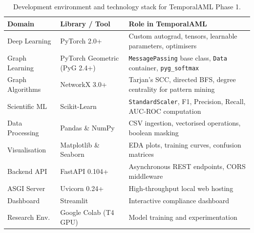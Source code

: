 \begin{table}[!htbp]
\centering
\small
\setlength{\tabcolsep}{4pt}
\renewcommand{\arraystretch}{0.94}
\caption[Technology Stack]{Development environment and technology stack for TemporalAML Phase 1.}
\label{tab:tech_stack}
\begin{tabularx}{\textwidth}{>{\hsize=0.72\hsize\raggedright\arraybackslash}X >{\hsize=0.88\hsize\raggedright\arraybackslash}X >{\hsize=1.40\hsize\raggedright\arraybackslash}X}
\toprule
\textbf{Domain} & \textbf{Library / Tool} & \textbf{Role in TemporalAML} \\
\midrule
Deep Learning & PyTorch 2.0+ & Custom autograd, tensors, learnable parameters, optimisers \\
Graph Learning & PyTorch Geometric (PyG 2.4+) & \texttt{MessagePassing} base class, \texttt{Data} container, \texttt{pyg\_softmax} \\
Graph Algorithms & NetworkX 3.0+ & Tarjan's SCC, directed BFS, degree centrality for pattern mining \\
Scientific ML & Scikit-Learn & \texttt{StandardScaler}, F1, Precision, Recall, AUC-ROC computation \\
Data Processing & Pandas \& NumPy & CSV ingestion, vectorised operations, boolean masking \\
Visualisation & Matplotlib \& Seaborn & EDA plots, training curves, confusion matrices \\
Backend API & FastAPI 0.104+ & Asynchronous REST endpoints, CORS middleware \\
ASGI Server & Uvicorn 0.24+ & High-throughput local web hosting \\
Dashboard & Streamlit & Interactive compliance dashboard \\
Research Env. & Google Colab (T4 GPU) & Model training and experimentation \\
\bottomrule
\end{tabularx}
\end{table}

